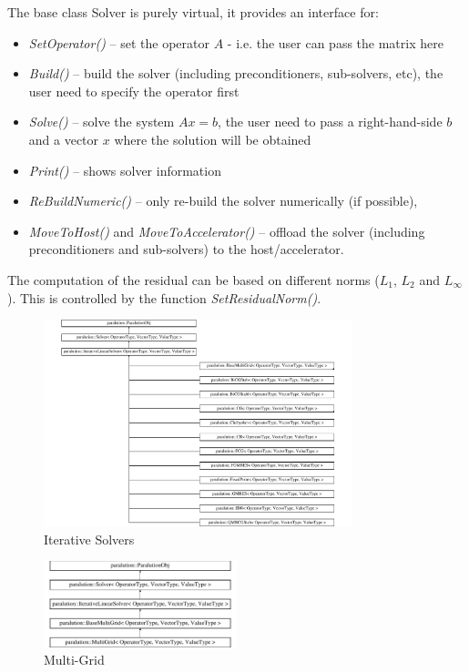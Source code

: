 The base class Solver is purely virtual, it provides an interface for:

\begin{itemize}
\itemsep0em
\item \emph{SetOperator()} -- set the operator $A$ - i.e. the user can pass the matrix here
\item \emph{Build()} -- build the solver (including preconditioners, sub-solvers, etc), the user need to specify the operator first
\item \emph{Solve()} -- solve the system $Ax=b$, the user need to pass a right-hand-side $b$ and a vector $x$ where the solution will be obtained
\item \emph{Print()} -- shows solver information
\item \emph{ReBuildNumeric()} -- only re-build the solver numerically (if possible), \item \emph{MoveToHost()} and \emph{MoveToAccelerator()} -- offload the solver (including preconditioners and sub-solvers) to the host/accelerator.
\end{itemize}

The computation of the residual can be based on different norms ($L_1$, $L_2$ and $L_{\infty}$). This is controlled by the function \emph{SetResidualNorm()}.


\begin{figure}[!ht]
\centering
\includegraphics[width=0.8\textwidth]{./fig/body/classparalution_1_1_iterative_linear_solver.pdf}
\caption{Iterative Solvers}
\end{figure}

\begin{figure}[!ht]
\centering
\includegraphics[width=0.5\textwidth]{./fig/body/classparalution_1_1_multi_grid.pdf}
\caption{Multi-Grid}
\end{figure}

